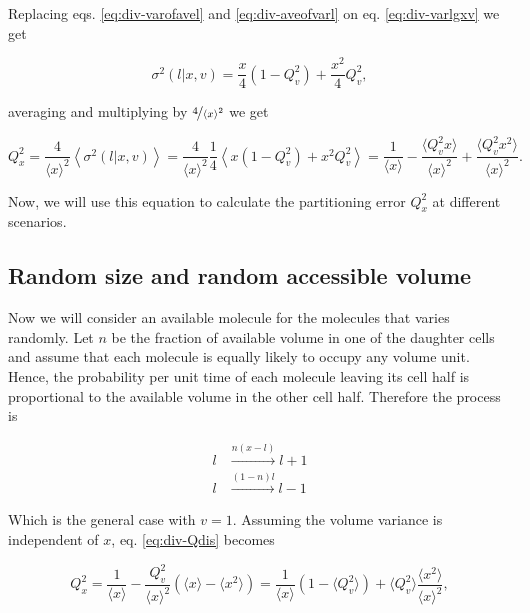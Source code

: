 Replacing eqs. \eqref{eq:div-varofavel} and \eqref{eq:div-aveofvarl} on eq. \eqref{eq:div-varlgxv} we get

\begin{equation*}
  \sigma^2(l|x,v) = \frac{x}{4}(1-Q_v^2)+\frac{x^2}{4}Q_v^2,
\end{equation*}

averaging and multiplying by $\nicefrac{4}{\langle x\rangle^2}$ we get

\begin{equation}
  \label{eq:div-Qdis}
  Q_x^2 = \frac{4}{\langle x\rangle^2}\left\langle\sigma^2(l|x,v)\right\rangle = \frac{4}{\langle x\rangle^2}\frac{1}{4}\left\langle x(1-Q_v^2) + x^2Q_v^2 \right\rangle = \frac{1}{\langle x\rangle} - \frac{\langle Q_v^2x\rangle}{\langle x\rangle^2} + \frac{\langle Q_v^2x^2\rangle}{\langle x\rangle^2}.
\end{equation}

Now, we will use this equation to calculate the partitioning error $Q_x^2$ at different scenarios.

\subsection{Random size and random accessible volume}

Now we will consider an available molecule for the molecules that varies randomly. Let $n$ be the fraction of available volume in one of the daughter cells and assume that each molecule is equally likely to occupy any volume unit. Hence, the probability per unit time of each molecule leaving its cell half is proportional to the available volume in the other cell half. Therefore the process is

\begin{equation}
  \begin{split}
    l&\xrightarrow{n(x-l)}l+1\\
    l&\xrightarrow{(1-n)l}l-1
  \end{split}
\end{equation}

Which is the general case with $v=1$. Assuming the volume variance is independent of $x$, eq. \eqref{eq:div-Qdis} becomes

\begin{equation}
  Q_x^2 = \frac{1}{\langle x\rangle} - \frac{Q_v^2}{\langle x\rangle^2}\left(\langle x\rangle  - \langle x^2\rangle\right) = \frac{1}{\langle x\rangle}\left(1-\langle Q_v^2\rangle\right) + \langle Q_v^2\rangle\frac{\langle x^2\rangle}{\langle x\rangle^2},
\end{equation}

